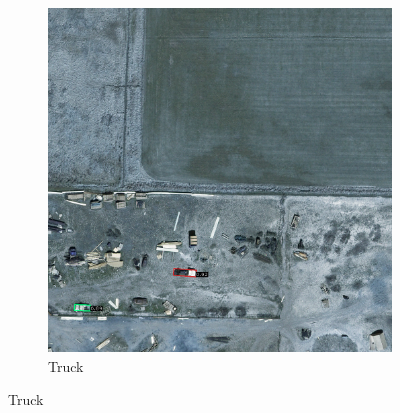 \begin{figure}[h!]
\begin{subfigure}[t]{0.38\textwidth}
        \includegraphics[width=\linewidth]{images/015Results/02perm_exp/comp_images/rgbir/212.png}
        \caption{Truck}
    \end{subfigure}
    

\end{figure}
